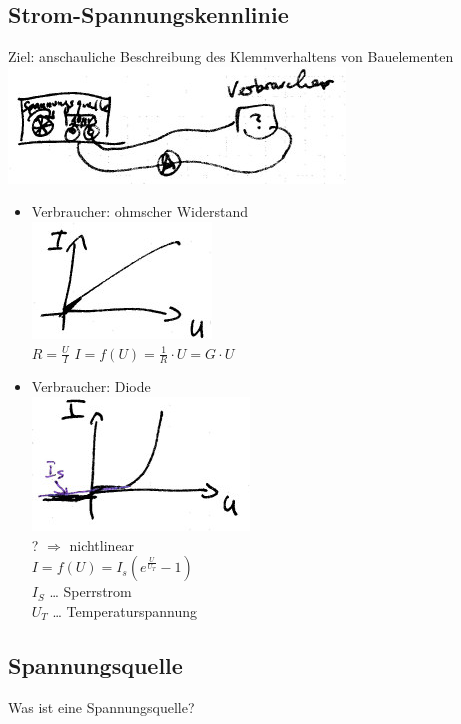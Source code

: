 \subsection{Strom-Spannungskennlinie}
Ziel: anschauliche Beschreibung des Klemmverhaltens von Bauelementen\\
\includegraphics[scale=.75]{Abbildungen/ABB304}
\begin{itemize}
\item Verbraucher: ohmscher Widerstand\\
\includegraphics[scale=.75]{Abbildungen/ABB305}\\
$R=\frac{U}{I}$
$I=f(U)=\frac{1}{R}\cdot U = G \cdot U$
\item Verbraucher: Diode\\
\includegraphics[scale=.75]{Abbildungen/ABB306}\\
? $\Rightarrow$ nichtlinear\\
$I=f(U)=I_s\left(e^{\frac{U}{U_T}}-1\right)$\\
$I_S$ … Sperrstrom\\
$U_T$ … Temperaturspannung 
\end{itemize}

\subsection{Spannungsquelle}

Was ist eine Spannungsquelle?

